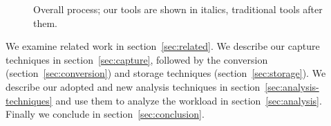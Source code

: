 \begin{figure}
\center {}
\caption{Overall process; our tools are shown in italics, traditional tools
after them.}
\label{fig:overall-process}
\end{figure}

We examine related work in section~\ref{sec:related}.  We describe our
capture techniques in section~\ref{sec:capture}, followed by the
conversion (section~\ref{sec:conversion}) and storage
techniques (section~\ref{sec:storage}).  We describe our adopted and
new analysis techniques in section~\ref{sec:analysis-techniques} and
use them to analyze the workload in section~\ref{sec:analysis}.
Finally we conclude in section~\ref{sec:conclusion}.

